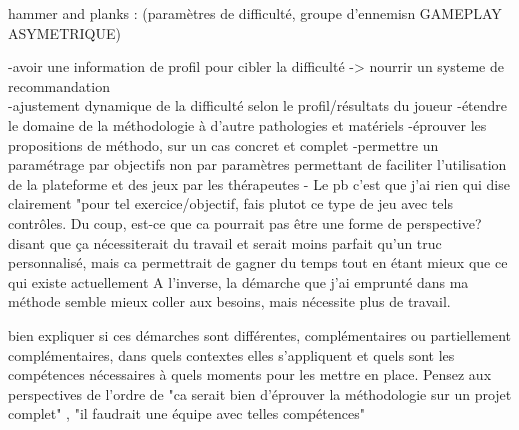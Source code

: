 	hammer and planks : (paramètres de difficulté, groupe d'ennemisn GAMEPLAY ASYMETRIQUE)\newline
	
	-avoir une information de profil pour cibler la difficulté -> nourrir un systeme de recommandation\\
	-ajustement dynamique de la difficulté selon le profil/résultats du joueur\newline
	-étendre le domaine de la méthodologie à d'autre pathologies et matériels\newline
	-éprouver les propositions de méthodo, sur un cas concret et complet\newline
	-permettre un paramétrage par objectifs non par paramètres permettant de faciliter l'utilisation de la plateforme et des jeux par les thérapeutes \newline
	- Le pb c'est que j'ai rien qui dise clairement "pour tel exercice/objectif, fais plutot ce type de jeu avec tels contrôles. Du coup, est-ce que ca pourrait pas être une forme de perspective? disant que ça nécessiterait du travail et serait moins parfait qu'un truc personnalisé, mais ca permettrait de gagner du temps tout en étant mieux que ce qui existe actuellement
	A l'inverse, la démarche que j'ai emprunté dans ma méthode semble mieux coller aux besoins, mais nécessite plus de travail.
 
 bien expliquer si ces démarches sont différentes, complémentaires ou partiellement complémentaires, dans quels contextes elles s'appliquent et quels sont les compétences nécessaires à quels moments pour les mettre en place.
 Pensez aux perspectives de l'ordre de "ca serait bien d'éprouver la méthodologie sur un projet complet" , "il faudrait une équipe avec telles compétences"